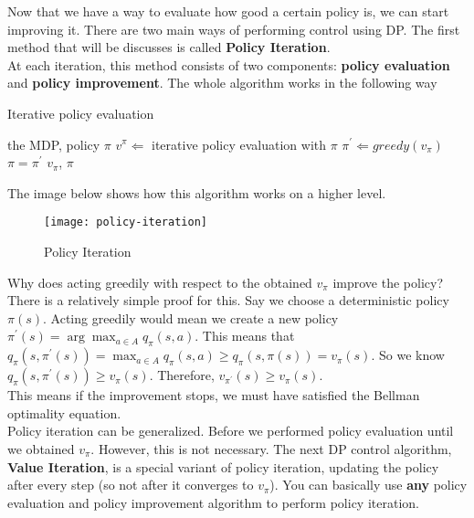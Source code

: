 Now that we have a way to evaluate how good a certain policy is, we can start improving it. There are two main ways of performing control using DP. The first method that will be discusses is called \textbf{Policy Iteration}.\\

At each iteration, this method consists of two components: \textbf{policy evaluation} and \textbf{policy improvement}. The whole algorithm works in the following way

\begin{algorithm}[H]
	\caption{Iterative policy evaluation}
	\label{alg:it-pol-eval}
	\begin{algorithmic}
		\REQUIRE the MDP, policy $\pi$
			\STATE $v^\pi \Leftarrow$ iterative policy evaluation with $\pi$
			\STATE $\pi^\prime \Leftarrow greedy(v_\pi)$
			\STATE $\pi = \pi^\prime$
		\ENDWHILE
		\RETURN $v_\pi$, $\pi$
	\end{algorithmic}
\end{algorithm}

The image below shows how this algorithm works on a higher level.

\begin{figure}[H]
	\centering
	\texttt{[image: policy-iteration]}
	\caption{Policy Iteration}
	\label{img:policy-iteration}
\end{figure}

Why does acting greedily with respect to the obtained $v_\pi$ improve the policy? There is a relatively simple proof for this. Say we choose a deterministic policy $\pi(s)$. Acting greedily would mean we create a new policy $\pi^\prime(s) = \arg \max_{a \in A} q_\pi(s, a)$. This means that $q_\pi(s, \pi^\prime(s)) = \max_{a \in A} q_\pi(s,a) \geq q_\pi(s, \pi(s)) = v_\pi(s)$. So we know $q_\pi(s, \pi^\prime(s)) \geq v_\pi(s)$. Therefore, $v_{\pi^\prime}(s) \geq v_\pi(s)$.\\

This means if the improvement stops, we must have satisfied the Bellman optimality equation.\\

Policy iteration can be generalized. Before we performed policy evaluation until we obtained $v_\pi$. However, this is not necessary. The next DP control algorithm, \textbf{Value Iteration}, is a special variant of policy iteration, updating the policy after every step (so not after it converges to $v_\pi$). You can basically use \textbf{any} policy evaluation and policy improvement algorithm to perform policy iteration.\\

